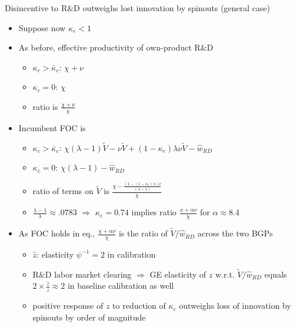 \documentclass[english,usenames,dvipsnames]{beamer}
\begin{document}
\begin{frame}{Disincentive to R\&D outweighs lost innovation by spinouts (general case)}\label{disincentive_outweighs_general}
	\hyperlink{disincentive_outweighs_main}{}
	\begin{itemize}
		\footnotesize
		\item Suppose now $\kappa_e < 1$
		\item As before, effective productivity of own-product R\&D
		\begin{itemize}
			\footnotesize
			\item $\kappa_c > \bar{\kappa}_c$: $\chi + \nu$
			\item $\kappa_c = 0$: $\chi$
			\item ratio is $\frac{\chi + \nu}{\chi}$
		\end{itemize}
		\item Incumbent FOC is 
		\begin{itemize}
			\footnotesize
			\item $\kappa_c > \bar{\kappa}_c$: $\chi (\lambda - 1) \tilde{V} - \nu \tilde{V} + (1 - \kappa_e) \lambda \nu \tilde{V} - \hat{w}_{RD}$
			\item $\kappa_c = 0$: $\chi (\lambda -1) - \hat{w}_{RD}$
			\item ratio of terms on $\tilde{V}$ is $\frac{\chi - \frac{(1 - (1-\kappa_e)\lambda ) \nu }{(\lambda -1)}}{\chi}$
			\item $\frac{\lambda-1}{\lambda} \approx .0783$ $\Rightarrow$ $\kappa_e = 0.74$ implies ratio $\frac{x + \alpha \nu}{\chi}$ for $\alpha \approx 8.4$
		\end{itemize}
		\item As FOC holds in eq., $\frac{\chi + \alpha \nu}{\chi}$ is the ratio of $\tilde{V} / \hat{w}_{RD}$ across the two BGPs
		\begin{itemize}
			\footnotesize
			\item $\hat{z}$: elasticity $\psi^{-1} = 2$ in calibration
			\item R\&D labor market clearing $\Rightarrow$ GE elasticity of $z$ w.r.t. $\tilde{V}/ \hat{w}_{RD}$ equals $2 \times \frac{\hat{z}}{z} \approx 2$ in baseline calibration as well
			\item positive response of $z$ to reduction of $\kappa_c$ outweighs loss of innovation by spinouts by order of magnitude
		\end{itemize} 
	\end{itemize}
\end{frame}
\end{document}
